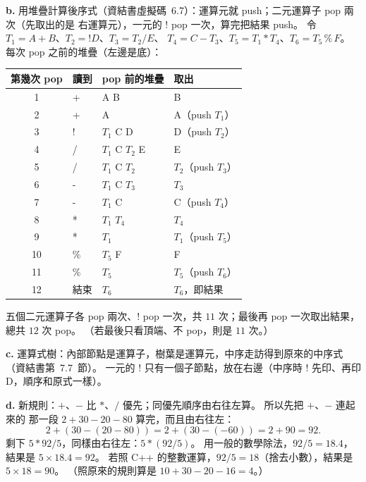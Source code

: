 \begin{pastsoln}
\textbf{b.} 用堆疊計算後序式（資結書虛擬碼~6.7）：運算元就 push；二元運算子 pop 兩次（先取出的是
右運算元），一元的 ! pop 一次，算完把結果 push。 令 $T_1 = A + B$、$T_2 = !D$、$T_3 = T_2 / E$、
$T_4 = C - T_3$、$T_5 = T_1 * T_4$、$T_6 = T_5 \,\%\, F$。 每次 pop 之前的堆疊（左邊是底）：
\begin{center}
\small
\begin{tabular}{clll}
\toprule
第幾次 pop & 讀到 & pop 前的堆疊 & 取出 \\
\midrule
1 & + & A B & B \\
2 & + & A & A（push $T_1$） \\
3 & ! & $T_1$ C D & D（push $T_2$） \\
4 & / & $T_1$ C $T_2$ E & E \\
5 & / & $T_1$ C $T_2$ & $T_2$（push $T_3$） \\
6 & - & $T_1$ C $T_3$ & $T_3$ \\
7 & - & $T_1$ C & C（push $T_4$） \\
8 & * & $T_1$ $T_4$ & $T_4$ \\
9 & * & $T_1$ & $T_1$（push $T_5$） \\
10 & \% & $T_5$ F & F \\
11 & \% & $T_5$ & $T_5$（push $T_6$） \\
12 & 結束 & $T_6$ & $T_6$，即結果 \\
\bottomrule
\end{tabular}
\end{center}
五個二元運算子各 pop 兩次、! pop 一次，共 $11$ 次；最後再 pop 一次取出結果，總共 $12$ 次 pop。
（若最後只看頂端、不 pop，則是 $11$ 次。）

\textbf{c.} 運算式樹：內部節點是運算子，樹葉是運算元，中序走訪得到原來的中序式（資結書第~7.7~節）。
一元的 ! 只有一個子節點，放在右邊（中序時 ! 先印、再印 D，順序和原式一樣）。
\begin{center}
\end{center}

\textbf{d.} 新規則：$+$、$-$ 比 $*$、$/$ 優先；同優先順序由右往左算。 所以先把 $+$、$-$ 連起來的
那一段 $2 + 30 - 20 - 80$ 算完，而且由右往左：
\[
2 + (30 - (20 - 80)) = 2 + (30 - (-60)) = 2 + 90 = 92 .
\]
剩下 $5 * 92 / 5$，同樣由右往左：$5 * (92 / 5)$。 用一般的數學除法，$92 / 5 = 18.4$，結果是
$5 \times 18.4 = 92$。 若照 C++ 的整數運算，$92 / 5 = 18$（捨去小數），結果是 $5 \times 18 = 90$。
（照原來的規則算是 $10 + 30 - 20 - 16 = 4$。）
\end{pastsoln}
